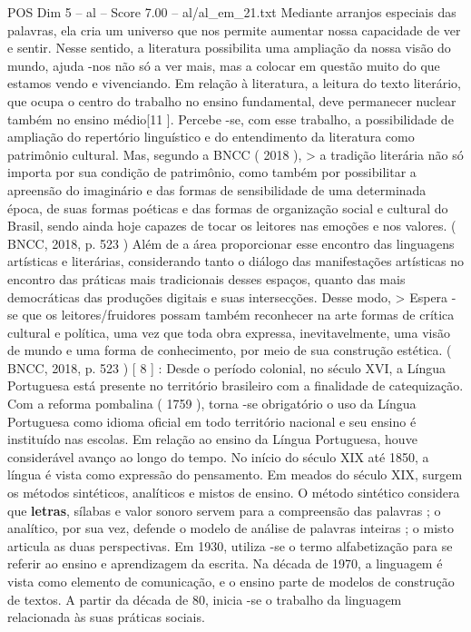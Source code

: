 \begin{textsample}{POS Dim 5 – al – Score 7.00 – al/al\_em\_21.txt}
Mediante arranjos especiais das palavras, ela cria um universo que nos permite aumentar nossa capacidade de ver e sentir.
Nesse sentido, a literatura possibilita uma ampliação da nossa visão do mundo, ajuda -nos não só a ver mais, mas a colocar em questão muito do que estamos vendo e vivenciando.
Em relação à literatura, a leitura do texto literário, que ocupa o centro do trabalho no ensino fundamental, deve permanecer nuclear também no ensino médio[11 ].
Percebe -se, com esse trabalho, a possibilidade de ampliação do repertório linguístico e do entendimento da literatura como patrimônio cultural.
Mas, segundo a BNCC ( 2018 ), > a tradição literária não só importa por sua condição de patrimônio, como também por possibilitar a apreensão do imaginário e das formas de sensibilidade de uma determinada época, de suas formas poéticas e das formas de organização social e cultural do Brasil, sendo ainda hoje capazes de tocar os leitores nas emoções e nos valores. ( BNCC, 2018, p. 523 ) Além de a área proporcionar esse encontro das linguagens artísticas e literárias, considerando tanto o diálogo das manifestações artísticas no encontro das práticas mais tradicionais desses espaços, quanto das mais democráticas das produções digitais e suas intersecções.
Desse modo, > Espera -se que os leitores/fruidores possam também reconhecer na arte formas de crítica cultural e política, uma vez que toda obra expressa, inevitavelmente, uma visão de mundo e uma forma de conhecimento, por meio de sua construção estética. ( BNCC, 2018, p. 523 ) [ 8 ] : Desde o período colonial, no século XVI, a Língua Portuguesa está presente no território brasileiro com a finalidade de catequização.
Com a reforma pombalina ( 1759 ), torna -se obrigatório o uso da Língua Portuguesa como idioma oficial em todo território nacional e seu ensino é instituído nas escolas.
Em relação ao ensino da Língua Portuguesa, houve considerável avanço ao longo do tempo.
No início do século XIX até 1850, a língua é vista como expressão do pensamento.
Em meados do século XIX, surgem os métodos sintéticos, analíticos e mistos de ensino.
O método sintético considera que \textbf{letras}, sílabas e valor sonoro servem para a compreensão das palavras ; o analítico, por sua vez, defende o modelo de análise de palavras inteiras ; o misto articula as duas perspectivas.
Em 1930, utiliza -se o termo alfabetização para se referir ao ensino e aprendizagem da escrita.
Na década de 1970, a linguagem é vista como elemento de comunicação, e o ensino parte de modelos de construção de textos.
A partir da década de 80, inicia -se o trabalho da linguagem relacionada às suas práticas sociais.

\end{textsample}
